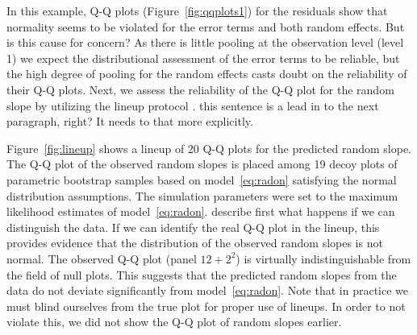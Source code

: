 \documentclass[12pt]{article} %
\newcommand{\hh}[1]{{\color{orange} #1}}
\newcommand{\al}[1]{{\color{red} #1}}
\begin{document}
In this example, Q-Q plots (Figure~\ref{fig:qqplots1}) for the residuals show that normality 
seems to be violated for the error terms and both random effects. But is this cause for concern?
\al{As} there is little pooling at the observation level \al{(level 1)} we expect the distributional assessment of the error terms to be reliable, but the high degree of pooling  for the random effects  casts doubt on the reliability of their Q-Q plots. Next, we assess the reliability of the Q-Q plot for the random slope by utilizing the lineup protocol \citep{buja:2009}.
\hh{this sentence is a lead in to the next paragraph, right? It needs to that more explicitly.}

Figure~\ref{fig:lineup} shows a lineup \citep{buja:2009} of 20 Q-Q plots for the predicted random slope. The Q-Q plot of the observed random slopes is placed among 19 decoy plots of parametric bootstrap samples based on model~\eqref{eq:radon} satisfying the normal distribution assumptions. The simulation parameters were set to the maximum likelihood estimates of model~\eqref{eq:radon}. 
\hh{describe first what happens if we can distinguish the data.}
\al{If we can identify the real Q-Q plot in the lineup, this provides evidence that the distribution of the observed random slopes is not normal.}
The observed Q-Q plot (panel $12+2^2$) is virtually indistinguishable from the field of null plots. This suggests that the predicted random slopes  from the data do not deviate significantly from model~\eqref{eq:radon}. 
Note that in practice we must blind ourselves from the true plot for proper use of lineups. In order to not violate this, we did not show the Q-Q plot of random slopes earlier.
%
%
\end{document}
